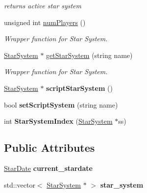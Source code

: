 \begin{DoxyCompactItemize}
\begin{DoxyCompactList}\small\item\em returns active star system \end{DoxyCompactList}\item 
unsigned int \hyperlink{classUniverse_a7ee0f80ac31698ac9bf4fba5dbff0367}{num\+Players} ()
\begin{DoxyCompactList}\small\item\em Wrapper function for Star System. \end{DoxyCompactList}\item 
\hyperlink{classStarSystem}{Star\+System} $\ast$ \hyperlink{classUniverse_a0c93df0a193723c26f031fa81cde3b2a}{get\+Star\+System} (string name)
\begin{DoxyCompactList}\small\item\em Wrapper function for Star System. \end{DoxyCompactList}\item 
\hyperlink{classStarSystem}{Star\+System} $\ast$ {\bfseries script\+Star\+System} ()\hypertarget{classUniverse_a84035c7dea1ab15166409a7b22309569}{}\label{classUniverse_a84035c7dea1ab15166409a7b22309569}

\item 
bool {\bfseries set\+Script\+System} (string name)\hypertarget{classUniverse_aae67414b77c1eb36436bde7ab7000611}{}\label{classUniverse_aae67414b77c1eb36436bde7ab7000611}

\item 
int {\bfseries Star\+System\+Index} (\hyperlink{classStarSystem}{Star\+System} $\ast$ss)\hypertarget{classUniverse_a3697067a136d214e18c07b763cac1803}{}\label{classUniverse_a3697067a136d214e18c07b763cac1803}

\end{DoxyCompactItemize}
\subsection*{Public Attributes}
\begin{DoxyCompactItemize}
\item 
\hyperlink{classStarDate}{Star\+Date} {\bfseries current\+\_\+stardate}\hypertarget{classUniverse_a962416d6d4fa7914e30ab83c2102cfcb}{}\label{classUniverse_a962416d6d4fa7914e30ab83c2102cfcb}

\item 
std\+::vector$<$ \hyperlink{classStarSystem}{Star\+System} $\ast$ $>$ {\bfseries star\+\_\+system}\hypertarget{classUniverse_a3bf1db67c11954196e1fa392d5f87ebc}{}\label{classUniverse_a3bf1db67c11954196e1fa392d5f87ebc}

\end{DoxyCompactItemize}
